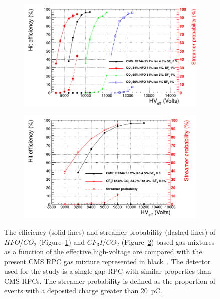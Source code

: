 \endgroup
	
	\begin{figure}[H]
		\begin{subfigure}{0.5\linewidth}
			\centering
			\includegraphics[width=\linewidth]{fig/chapt3/HFO-mixture.pdf}
			\caption{\label{fig:RPC-eco:A}}
		\end{subfigure}
		\begin{subfigure}{0.5\linewidth}
			\centering
			\includegraphics[width=\linewidth]{fig/chapt3/CF3I-mixture.pdf}
			\caption{\label{fig:RPC-eco:B}}
		\end{subfigure}
		\caption{\label{fig:RPC-eco} The efficiency (solid lines) and streamer probability (dashed lines) of $HFO$/$CO_2$ (Figure~\ref{fig:RPC-eco:A}) and $CF_3I$/$CO_2$ (Figure~\ref{fig:RPC-eco:B}) based gas mixtures as a function of the effective high-voltage are compared with the present CMS RPC gas mixture represented in black~\cite{PHASEIITP}. The detector used for the study is a single gap RPC with similar properties than CMS RPCs. The streamer probability is defined as the proportion of events with a deposited charge greater than \SI{20}{pC}.}
	\end{figure}

